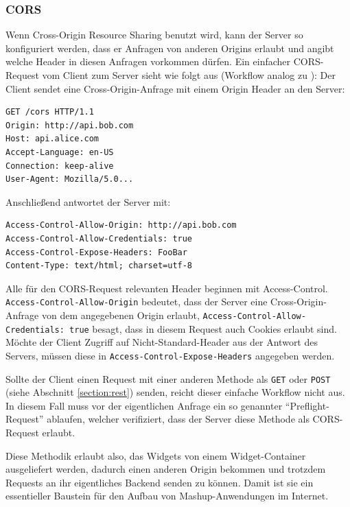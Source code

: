 \subsubsection*{CORS}
Wenn Cross-Origin Resource Sharing benutzt wird, kann der Server so konfiguriert werden, dass er Anfragen von anderen Origins erlaubt und angibt welche Header in diesen Anfragen vorkommen dürfen. Ein einfacher CORS-Request vom Client zum Server sieht wie folgt aus (Workflow analog zu \cite{Hossain2012}):
Der Client sendet eine Cross-Origin-Anfrage mit einem Origin Header an den Server:
\begin{lstlisting}
GET /cors HTTP/1.1
Origin: http://api.bob.com
Host: api.alice.com
Accept-Language: en-US
Connection: keep-alive
User-Agent: Mozilla/5.0...
\end{lstlisting}
Anschließend antwortet der Server mit:
\begin{lstlisting}
Access-Control-Allow-Origin: http://api.bob.com
Access-Control-Allow-Credentials: true
Access-Control-Expose-Headers: FooBar
Content-Type: text/html; charset=utf-8
\end{lstlisting}
Alle für den CORS-Request relevanten Header beginnen mit Access-Control. \texttt{Access\allowbreak -Control\allowbreak -Allow\allowbreak -Origin} bedeutet, dass der Server eine Cross-Origin-Anfrage von dem angegebenen Origin erlaubt, \texttt{Access\allowbreak -Control\allowbreak -Allow\allowbreak -Credentials: true} besagt, dass in diesem Request auch Cookies erlaubt sind. Möchte der Client Zugriff auf Nicht-Standard-Header aus der Antwort des Servers, müssen diese in \texttt{Access\allowbreak -Control\allowbreak -Expose\allowbreak -Headers} angegeben werden.

Sollte der Client einen Request mit einer anderen Methode als \texttt{GET} oder \texttt{POST} (siehe Abschnitt \ref{section:rest}) senden, reicht dieser einfache Workflow nicht aus. In diesem Fall muss vor der eigentlichen Anfrage ein so genannter "`Preflight-Request"' ablaufen, welcher verifiziert, dass der Server diese Methode als CORS-Request erlaubt.

Diese Methodik erlaubt also, das Widgets von einem Widget-Container ausgeliefert werden, dadurch einen anderen Origin bekommen und trotzdem Requests an ihr eigentliches Backend senden zu können. Damit ist sie ein essentieller Baustein für den Aufbau von Mashup-Anwendungen im Internet.

